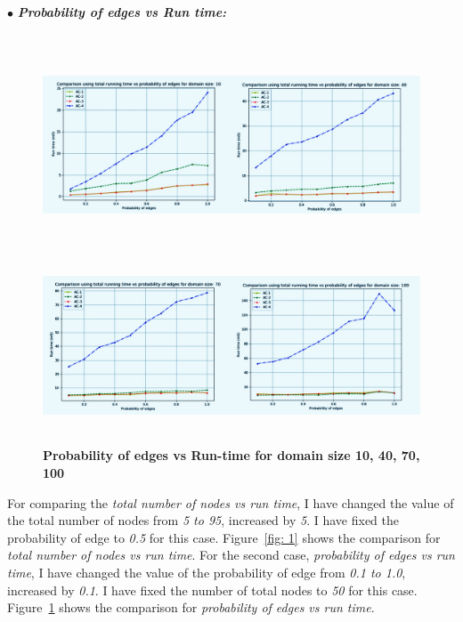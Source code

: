\documentclass[12pt, english]{article}
\begin{document}
\hspace*{0.5cm}$\bullet$ \textit{\textbf{Probability of edges vs Run time:}}
\begin{figure}[ht]
		{\includegraphics[width=\textwidth,height=2.6in]{3.jpeg}}
		{\includegraphics[width=\textwidth,height=2in]{4.jpeg}}
		\caption{\textbf{Probability of edges vs Run-time for domain size 10, 40, 70, 100}}
        \label{fig: 2}
\end{figure}

\par
For comparing the \textit{total number of nodes vs run time}, I have changed the value of the total number of nodes from \textit{5 to 95}, increased by \textit{5}. I have fixed the probability of edge to \textit{0.5} for this case. Figure~\ref{fig: 1} shows the comparison for \textit{total number of nodes vs run time}. For the second case, \textit{probability of edges vs run time}, I have changed the value of the probability of edge from \textit{0.1 to 1.0}, increased by \textit{0.1}. I have fixed the number of total nodes to \textit{50} for this case. Figure~\ref{fig: 2} shows the comparison for \textit{probability of edges vs run time}.
\end{document}
